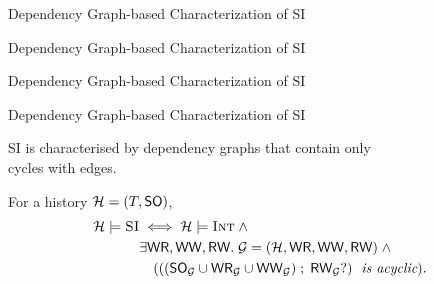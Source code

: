 
\begin{frame}{Dependency Graph-based Characterization of SI}
  \begin{center}

		\vspace{0.20cm}
		{}
		\vspace{0.20cm}

  \end{center}
\end{frame}

\begin{frame}{Dependency Graph-based Characterization of SI}
  \begin{center}
  \end{center}
\end{frame}

\begin{frame}{Dependency Graph-based Characterization of SI}
  \begin{center}
  \end{center}
\end{frame}

\begin{frame}{Dependency Graph-based Characterization of SI}
	\begin{center}
		SI is characterised by dependency graphs that contain only \\[5pt]
		cycles with  edges.
	\end{center}

	\vspace{0.50cm}
  \begin{theorem}
		For a history \emph{$\mathcal{H} = (T, \textup{\textsf{SO}})$},
		\emph{\begin{align*}
			\mathcal{H} \models \textsc{SI} & \iff \mathcal{H} \models \textsc{Int} \;\land \\
				&\exists \textup{\textsf{WR}}, \textup{\textsf{WW}}, \textup{\textsf{RW}}.\; \mathcal{G} = (\mathcal{H}, \textup{\textsf{WR}}, \textup{\textsf{WW}}, \textup{\textsf{RW}}) \;\land \\
				&\quad (((\textup{\textsf{SO}}_{\mathcal{G}} \cup \textup{\textsf{WR}}_{\mathcal{G}} \cup \textup{\textsf{WW}}_{\mathcal{G}}) \;;\; \textup{\textsf{RW}}_{\mathcal{G}}?) \text{\it\; is acyclic}).
		\end{align*}}
  \end{theorem}
\end{frame}
